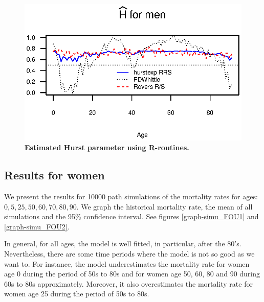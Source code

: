 \documentclass[smallextended]{svjour3}
\begin{document}
\begin{figure}[H]
    \includegraphics{Hurst-Men.eps}
    \caption{\bf Estimated Hurst parameter using R-routines.}
    \label{graph-Hurst_Est_Me}
\end{figure}\vspace*{0.1cm}

\subsection{Results for women}\label{re-wom}

We present the results for 10000 path simulations of the mortality 
rates for ages: $0,5,25,50,60,70,80,90$.
We graph the historical mortality rate, the mean of all simulations and the
95\% confidence interval. See figures \ref{graph-simu_FOU1} and
\ref{graph-simu_FOU2}.

In general, for all ages, the model is well fitted, in particular, after the
80's. Nevertheless, there are some time periods where the model is not
so good as we want to. For instance, the model underestimates the mortality
rate for women age 0 during the period of 50s to 80s and for women age 50, 60,
80 and 90 during
60s to 80s approximately. Moreover, it also overestimates the mortality rate for
women age 25 during the period of 50s to 80s.
\end{document}
